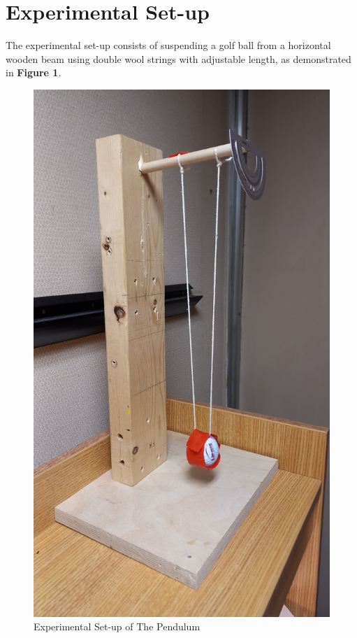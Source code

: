 \documentclass{article}
\begin{document}
\section{Experimental Set-up}

The experimental set-up consists of suspending a golf ball from a horizontal wooden beam using double wool strings with adjustable length, as demonstrated in \textbf{Figure 1}.

\begin{figure}[!htb]
	\centering
	\includegraphics[scale=0.025, angle = 270]{experimental_setup_pendulum.jpg}
	\caption{Experimental Set-up of The Pendulum}
	\label{fig_angle}
\end{figure}
\end{document}
